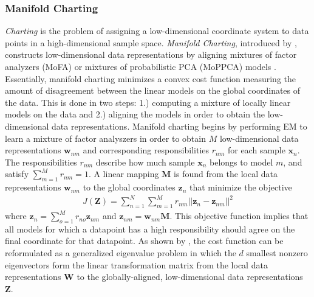 \subsubsection{Manifold Charting} \label{sec:Manifold_Charting}
\textit{Charting} is the problem of assigning a low-dimensional coordinate system to data points in a high-dimensional sample space. \textit{Manifold Charting}, introduced by \citep{Brand2003ManifoldCharting}, constructs low-dimensional data representations by aligning mixtures of factor analyzers (MoFA) or mixtures of probabilistic PCA (MoPPCA) models \citep{VanDerMaaten2009DRReview}.  Essentially, manifold charting minimizes a convex cost function measuring the amount of disagreement between the linear models on the global coordinates of the data. This is done in two steps: 1.) computing a mixture of locally linear models on the data and 2.) aligning the models in order to obtain the low-dimensional data representations.   Manifold charting begins by performing EM to learn a mixture of factor analyszers in order to obtain $M$ low-dimensional data representations $\bm{w}_{nm}$ and corresponding responsibilities $r_{nm}$ for each sample $\bm{x}_{n}$.  The responsibilities  $r_{nm}$ describe how much sample $\bm{x}_{n}$ belongs to model $m$, and satisfy $\sum_{m=1}^{M}r_{nm}=1$.  A linear mapping $\bm{M}$ is found from the local data representations $\bm{w}_{nm}$ to the global coordinates $\bm{z}_{n}$ that minimize the objective 
\begin{align}
	J(\bm{Z}) = \sum_{n=1}^{N}\sum_{m=1}^{M} r_{nm} ||\bm{z}_{n} - \bm{z}_{nm} ||^{2}
\end{align} 
\noindent
where $\bm{z}_{n} = \sum_{o=1}^{M}r_{no}\bm{z}_{nm}$ and $\bm{z}_{nm} = \bm{w}_{nm}\bm{M}$.  This objective function implies that all models for which a datapoint has a high responsibility should agree on the final coordinate for that datapoint.  As shown by \citep{VanDerMaaten2009DRReview}, the cost function can be reformulated as a generalized eigenvalue problem in which the $d$ smallest nonzero eigenvectors form the linear transformation matrix from the local data representations $\bm{W}$ to the globally-aligned, low-dimensional data representations $\bm{Z}$.

